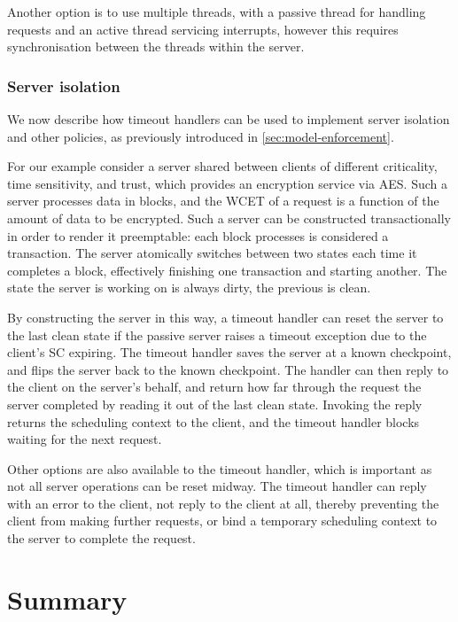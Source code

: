 Another option is to use multiple threads, with a passive thread for handling requests and an active
thread servicing interrupts, however this requires synchronisation between the threads within the
server.

\subsubsection{Server isolation}

We now describe how timeout handlers can be used to implement server isolation and other policies,
as previously introduced in \cref{sec:model-enforcement}. 

For our example consider a server shared between clients of different criticality, time sensitivity,
and trust, which provides an encryption service via \gls{AES}. 
Such a server processes data in blocks, and the \gls{WCET} of a request is a function of the 
amount of data to be encrypted. Such a server can be constructed transactionally in order
to render it preemptable: each block processes is considered a transaction. The server atomically
switches between two states each time it completes a block, effectively finishing one transaction
and starting another. The state the server is working on is always dirty, the previous is clean. 

By constructing the server in this way, a timeout handler can reset the server to the last clean
state if the passive server raises a timeout exception due to the client's \gls{SC} expiring. 
The timeout handler saves the server at a known checkpoint, and flips the server back to 
the known checkpoint. The handler can then reply to the client on the server's behalf, and return how
far through the request the server completed by reading it out of the last clean state. Invoking the
reply returns the scheduling context to the client, and the timeout handler blocks waiting for the
next request.

Other options are also available to the timeout handler, which is important as not all server
operations can be reset midway. The timeout handler can reply with an error to the client, 
not reply to the client at all, thereby preventing the client from making further requests, or 
bind a temporary scheduling context to the server to complete the request. 

\section{Summary}

